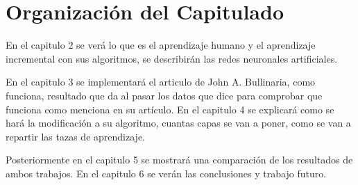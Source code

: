 
\section{Organización del Capitulado}


En el capitulo 2 se ver\'a lo que es el aprendizaje humano y el aprendizaje incremental con sus algoritmos, se describirán las redes neuronales artificiales.

En el capitulo 3 se implementar\'a el articulo de John A. Bullinaria, como funciona, resultado que da al pasar los datos que dice para comprobar que funciona como menciona en su art\'iculo. En el capitulo 4 se explicar\'a como se hará la modificación a su algoritmo, cuantas capas se van a poner, como se van a repartir las tazas de aprendizaje.

Posteriormente en el capitulo 5 se mostrar\'a una comparación de los resultados de ambos trabajos. En el capitulo 6 se verán las conclusiones y trabajo futuro.